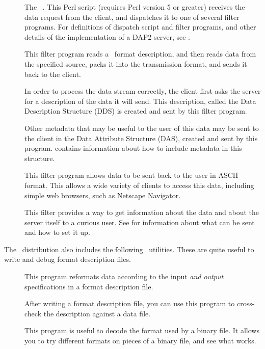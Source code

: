 \begin{description}
\item[] The \ffs\ .  This Perl script
  (requires Perl version 5 or greater) receives the data request from
  the client, and dispatches it to one of several filter programs.
  For definitions of dispatch script and filter programs, and other
  details of the implementation of a DAP2 server, see \DODSuser .
  
\item[] This filter program reads a \ffnd\ format
  description, and then reads data from the specified source, packs it
  into the transmission format, and sends it back to the client.
  
\item[] In order to process the data stream correctly, the
  client first asks the server for a description of the data it will
  send.  This description, called the Data Description Structure (DDS)
  is created and sent by this filter program.
  
\item[] Other metadata that may be useful to the user of
  this data may be sent to the client in the Data Attribute Structure
  (DAS), created and sent by this program.  
  contains information about how to include metadata in this
  structure.
  
\item[] This filter program allows data to be sent back
  to the user in ASCII format.  This allows a wide variety of clients
  to access this data, including simple web browsers, such as Netscape
  Navigator.
  
\item[] This filter provides a way to get information about
  the data and about the server itself to a curious user.  See
   for information about what can be sent and how
  to set it up.
\end{description}

The \ffs\ distribution also includes the following \ffnd\ utilities.
These are quite useful to write and debug format description files.

\begin{description}
\item[] This program reformats data according to the
  input \emph{and output} specifications in a format description file.

\item[] After writing a format description file, you can
  use this program to cross-check the description against a data file.

\item[] This program is useful to decode the format used
  by a binary file.  It allows you to try different formats on pieces
  of a binary file, and see what works.
\end{description}


